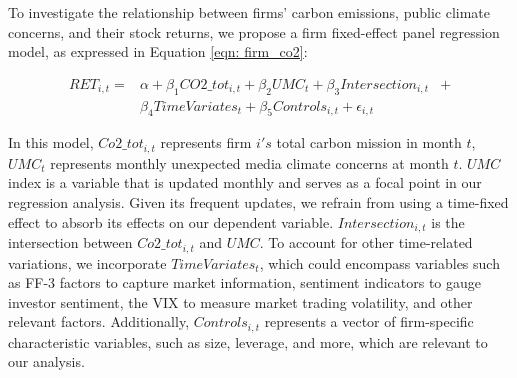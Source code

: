 \documentclass[12pt]{article}
\begin{document}
To investigate the relationship between firms' carbon emissions, public climate concerns, and their stock returns, we propose a firm fixed-effect panel regression model, as expressed in Equation \ref{eqn: firm_co2}:

\begin{equation}
\label{eqn: firm_co2}
\begin{aligned}
RET_{i,t} = & \alpha + \beta_1 CO2\_tot_{i, t} + \beta_2 UMC_{t} + \beta_3 Intersection_{i,t} &+ \\
            & \beta_4 Time Variates_t + \beta_5 Controls_{i, t} + \epsilon_{i, t}
\end{aligned}
\end{equation}

In this model, $Co2\_tot_{i,t}$ represents firm $i's$ total carbon mission in month $t$,  $UMC_t$ represents monthly unexpected media climate concerns at month $t$. $UMC$ index is a variable that is updated monthly and serves as a focal point in our regression analysis. Given its frequent updates, we refrain from using a time-fixed effect to absorb its effects on our dependent variable. $Intersection_{i,t}$ is the intersection between $Co2\_tot_{i,t}$ and $UMC$. To account for other time-related variations, we incorporate $Time Variates_t$, which could encompass variables such as FF-3 factors to capture market information, sentiment indicators to gauge investor sentiment, the VIX to measure market trading volatility, and other relevant factors. Additionally, $Controls_{i,t}$ represents a vector of firm-specific characteristic variables, such as size, leverage, and more, which are relevant to our analysis.
\end{document}
